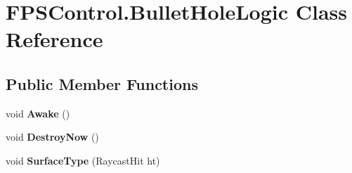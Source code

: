 \hypertarget{class_f_p_s_control_1_1_bullet_hole_logic}{\section{F\-P\-S\-Control.\-Bullet\-Hole\-Logic Class Reference}
\label{class_f_p_s_control_1_1_bullet_hole_logic}
}
\subsection*{Public Member Functions}
\begin{DoxyCompactItemize}
\item 
\hypertarget{class_f_p_s_control_1_1_bullet_hole_logic_a0f25c94506a09d61fdfd6e64e5a62507}{void {\bfseries Awake} ()}\label{class_f_p_s_control_1_1_bullet_hole_logic_a0f25c94506a09d61fdfd6e64e5a62507}

\item 
\hypertarget{class_f_p_s_control_1_1_bullet_hole_logic_ac4ddd4c74f76c87f5b3e9b5d38f8cede}{void {\bfseries Destroy\-Now} ()}\label{class_f_p_s_control_1_1_bullet_hole_logic_ac4ddd4c74f76c87f5b3e9b5d38f8cede}

\item 
\hypertarget{class_f_p_s_control_1_1_bullet_hole_logic_ab48f0c591376e515938beb5b0e524afb}{void {\bfseries Surface\-Type} (Raycast\-Hit ht)}\label{class_f_p_s_control_1_1_bullet_hole_logic_ab48f0c591376e515938beb5b0e524afb}

\end{DoxyCompactItemize}
